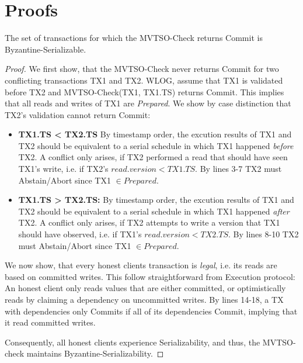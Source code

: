 \section{Proofs}

\begin{theorem}[1]
The set of transactions for which the MVTSO-Check returns Commit is Byzantine-Serializable. 
\end{theorem}
\begin{proof}

We first show, that the MVTSO-Check never returns Commit for two conflicting transactions TX1 and TX2.
WLOG, assume that TX1 is validated before TX2 and MVTSO-Check(TX1, TX1.TS) returns Commit. This implies that all reads and writes of TX1 are \textit{Prepared}.
We show by case distinction that TX2's validation cannot return Commit:
\begin{itemize}

\item \textbf{TX1.TS < TX2.TS} By timestamp order, the excution results of TX1 and TX2 should be equivalent to a serial schedule in which TX1 happened \textit{before} TX2. A conflict only arises, if TX2 performed a read that should have seen TX1's write, i.e. if TX2's $read.version < TX1.TS$. By lines 3-7 TX2 must Abstain/Abort since TX1 $\in Prepared$. 

\item \textbf{TX1.TS > TX2.TS:} By timestamp order, the excution results of TX1 and TX2 should be equivalent to a serial schedule in which TX1 happened \textit{after} TX2. A conflict only arises, if TX2 attempts to write a version that TX1 should have observed, i.e. if TX1's $read.version < TX2.TS$. By lines 8-10 TX2 must Abstain/Abort since TX1 $\in Prepared$. 
\end{itemize}

We now show, that every honest clients transaction is \textit{legal}, i.e. its reads are based on committed writes. This follow straightforward from Execution protocol: An honest client only reads values that are either committed, or optimistically reads by claiming a dependency on uncommitted writes. By lines 14-18, a TX with dependencies only Commits if all of its dependencies Commit, implying that it read committed writes.

Consequently, all honest clients experience Serializability, and thus, the MVTSO-check maintains Byzantine-Serializability.
\end{proof}

